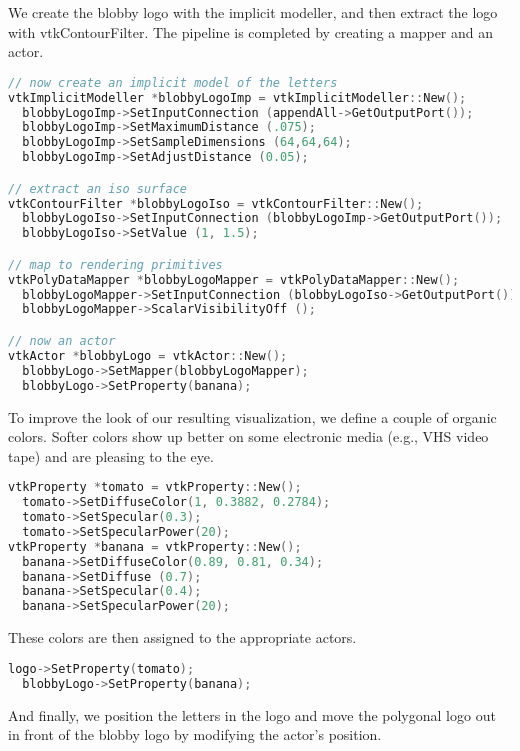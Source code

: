 We create the blobby logo with the implicit modeller, and then extract the logo with vtkContourFilter. The pipeline is completed by creating a mapper and an actor.

\begin{lstlisting}[language=C++, caption={Create an implicit model of the letters and extract the logo.}]
// now create an implicit model of the letters
vtkImplicitModeller *blobbyLogoImp = vtkImplicitModeller::New();
  blobbyLogoImp->SetInputConnection (appendAll->GetOutputPort());
  blobbyLogoImp->SetMaximumDistance (.075);
  blobbyLogoImp->SetSampleDimensions (64,64,64);
  blobbyLogoImp->SetAdjustDistance (0.05);

// extract an iso surface
vtkContourFilter *blobbyLogoIso = vtkContourFilter::New();
  blobbyLogoIso->SetInputConnection (blobbyLogoImp->GetOutputPort());
  blobbyLogoIso->SetValue (1, 1.5);

// map to rendering primitives
vtkPolyDataMapper *blobbyLogoMapper = vtkPolyDataMapper::New();
  blobbyLogoMapper->SetInputConnection (blobbyLogoIso->GetOutputPort());
  blobbyLogoMapper->ScalarVisibilityOff ();

// now an actor
vtkActor *blobbyLogo = vtkActor::New();
  blobbyLogo->SetMapper(blobbyLogoMapper);
  blobbyLogo->SetProperty(banana);
\end{lstlisting}

To improve the look of our resulting visualization, we define a couple of organic colors. Softer colors show up better on some electronic media (e.g., VHS video tape) and are pleasing to the eye.

\begin{lstlisting}[language=C++, caption={Define colors.}]
vtkProperty *tomato = vtkProperty::New();
  tomato->SetDiffuseColor(1, 0.3882, 0.2784);
  tomato->SetSpecular(0.3);
  tomato->SetSpecularPower(20);
vtkProperty *banana = vtkProperty::New();
  banana->SetDiffuseColor(0.89, 0.81, 0.34);
  banana->SetDiffuse (0.7);
  banana->SetSpecular(0.4);
  banana->SetSpecularPower(20);
\end{lstlisting}

These colors are then assigned to the appropriate actors.

\begin{lstlisting}[language=C++, caption={Assign colors to the appropriate actors.}]
  logo->SetProperty(tomato);
  blobbyLogo->SetProperty(banana);
\end{lstlisting}

And finally, we position the letters in the logo and move the
polygonal logo out in front of the blobby logo by modifying the
actor's position.

